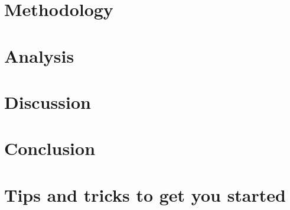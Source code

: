 \documentclass[english, a4paper, 12pt, twoside]{article}
\numberwithin{equation}{section} %
\begin{document}
\section{Methodology}
    
\clearpage
  
\section{Analysis}
    
\clearpage

\section{Discussion}
    
\clearpage

\section{Conclusion}
    
\clearpage

\newpage
\renewcommand\refname{References} %
{ %
}

\newpage
\renewcommand{\appendixpagename}{Appendix} %
\renewcommand{\appendixtocname}{Appendix} %
\appendixpage 
\addappheadtotoc

\begin{appendices}
    
\end{appendices}

\newpage
\section{Tips and tricks to get you started}
    
\end{document}
